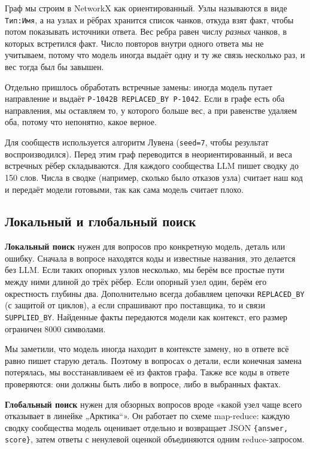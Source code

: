 \documentclass[a4paper,12pt]{article}
\newcommand{\code}[1]{\texttt{#1}}
\begin{document}
Граф мы строим в NetworkX как ориентированный. Узлы называются в виде \code{Тип:Имя}, а на узлах и рёбрах хранится список чанков, откуда взят факт, чтобы потом показывать источники ответа. Вес ребра равен числу \emph{разных} чанков, в которых встретился факт. Число повторов внутри одного ответа мы не учитываем, потому что модель иногда выдаёт одну и ту же связь несколько раз, и вес тогда был бы завышен.

Отдельно пришлось обработать встречные замены: иногда модель путает направление и выдаёт \code{P-1042B~REPLACED\_BY~P-1042}. Если в графе есть оба направления, мы оставляем то, у которого больше вес, а при равенстве удаляем оба, потому что непонятно, какое верное.

Для сообществ используется алгоритм Лувена (\code{seed=7}, чтобы результат воспроизводился). Перед этим граф переводится в неориентированный, и веса встречных рёбер складываются. Для каждого сообщества LLM пишет сводку до 150 слов. Числа в сводке (например, сколько было отказов узла) считает наш код и передаёт модели готовыми, так как сама модель считает плохо.

\subsection{Локальный и глобальный поиск}

\textbf{Локальный поиск} нужен для вопросов про конкретную модель, деталь или ошибку. Сначала в вопросе находятся коды и известные названия, это делается без LLM. Если таких опорных узлов несколько, мы берём все простые пути между ними длиной до трёх рёбер. Если опорный узел один, берём его окрестность глубины два. Дополнительно всегда добавляем цепочки \code{REPLACED\_BY} (с защитой от циклов), а если спрашивают про поставщика, то и связи \code{SUPPLIED\_BY}. Найденные факты передаются модели как контекст, его размер ограничен 8000 символами.

Мы заметили, что модель иногда находит в контексте замену, но в ответе всё равно пишет старую деталь. Поэтому в вопросах о детали, если конечная замена потерялась, мы восстанавливаем её из фактов графа. Также все коды в ответе проверяются: они должны быть либо в вопросе, либо в выбранных фактах.

\textbf{Глобальный поиск} нужен для обзорных вопросов вроде «какой узел чаще всего отказывает в линейке „Арктика“». Он работает по схеме map-reduce: каждую сводку сообщества модель оценивает отдельно и возвращает JSON \code{\{answer, score\}}, затем ответы с ненулевой оценкой объединяются одним reduce-запросом.
\end{document}
